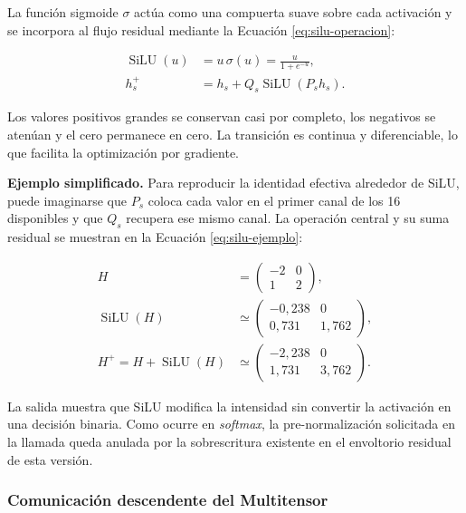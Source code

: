 \documentclass[11pt,a4paper,spanish]{book}
\numberwithin{equation}{chapter}
\numberwithin{figure}{chapter}
\begin{document}
La función sigmoide \(\sigma\) actúa como una compuerta suave sobre cada activación y se incorpora al flujo residual mediante la
Ecuación \eqref{eq:silu-operacion}:

\begin{equation}\label{eq:silu-operacion}
\begin{aligned}
\operatorname{SiLU}(u)
    &=u\,\sigma(u)=\frac{u}{1+e^{-u}},\\
h_s^{+}
    &=h_s+Q_s\operatorname{SiLU}(P_s h_s).
\end{aligned}
\end{equation}

Los valores positivos grandes se conservan casi por completo, los negativos se atenúan y el cero permanece en cero. La transición es
continua y diferenciable, lo que facilita la optimización por gradiente.

\textbf{Ejemplo simplificado.} Para reproducir la identidad efectiva alrededor de SiLU, puede imaginarse que \(P_s\) coloca cada
valor en el primer canal de los 16 disponibles y que \(Q_s\) recupera ese mismo canal. La operación central y su suma residual se
muestran en la Ecuación \eqref{eq:silu-ejemplo}:

\begin{equation}\label{eq:silu-ejemplo}
\begin{aligned}
H&=\begin{pmatrix}-2&0\\1&2\end{pmatrix},\\[1mm]
\operatorname{SiLU}(H)
 &\simeq\begin{pmatrix}
-0{,}238&0\\
0{,}731&1{,}762
\end{pmatrix},\\[1mm]
H^{+}=H+\operatorname{SiLU}(H)
 &\simeq\begin{pmatrix}
-2{,}238&0\\
1{,}731&3{,}762
\end{pmatrix}.
\end{aligned}
\end{equation}

La salida muestra que SiLU modifica la intensidad sin convertir la activación en una decisión binaria. Como ocurre en
\textit{softmax}, la pre-normalización solicitada en la llamada queda anulada por la sobrescritura existente en el envoltorio residual
de esta versión.

\subsubsection{Comunicación descendente del Multitensor}
\end{document}
